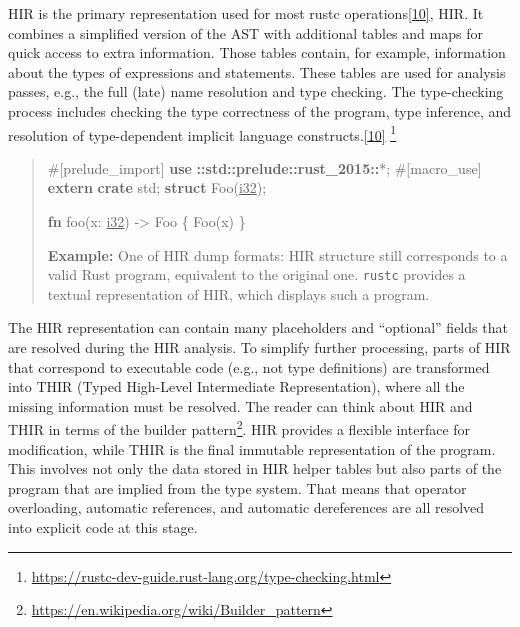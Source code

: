 \documentclass[
  11pt,
  twoside,symmetric]{report}
\newenvironment{Shaded}{}{}
\newcommand{\AttributeTok}[1]{#1}
\newcommand{\DataTypeTok}[1]{\underline{#1}}
\newcommand{\KeywordTok}[1]{\textbf{#1}}
\newcommand{\NormalTok}[1]{#1}
\newcommand{\OperatorTok}[1]{#1}
\newcommand{\PreprocessorTok}[1]{\textbf{#1}}
\DeclareRobustCommand{\href}[2]{#2\footnote{\url{#1}}}
\begin{document}
HIR is the primary representation used for most rustc
operations\protect\hyperlink{ref-devguide}{{[}10{]}}, HIR. It combines a
simplified version of the AST with additional tables and maps for quick
access to extra information. Those tables contain, for example,
information about the types of expressions and statements. These tables
are used for analysis passes, e.g., the full (late) name resolution and
type checking. The type-checking process includes checking the type
correctness of the program, type inference, and resolution of
type-dependent implicit language
constructs.\protect\hyperlink{ref-devguide}{{[}10{]}} \footnote{\url{https://rustc-dev-guide.rust-lang.org/type-checking.html}}

\begin{quote}
\begin{Shaded}
\begin{Highlighting}[]
 \AttributeTok{\#[}\NormalTok{prelude\_import}\AttributeTok{]}
 \KeywordTok{use} \PreprocessorTok{::std::prelude::rust\_2015::}\OperatorTok{*;}
 \AttributeTok{\#[}\NormalTok{macro\_use}\AttributeTok{]}
 \KeywordTok{extern} \KeywordTok{crate}\NormalTok{ std}\OperatorTok{;}
 \KeywordTok{struct}\NormalTok{ Foo(}\DataTypeTok{i32}\NormalTok{)}\OperatorTok{;}

 \KeywordTok{fn}\NormalTok{ foo(x}\OperatorTok{:} \DataTypeTok{i32}\NormalTok{) }\OperatorTok{{-}\textgreater{}}\NormalTok{ Foo }\OperatorTok{\{}\NormalTok{ Foo(x) }\OperatorTok{\}}
\end{Highlighting}
\end{Shaded}

\textbf{Example:} One of HIR dump formats: HIR structure still
corresponds to a valid Rust program, equivalent to the original one.
\texttt{rustc} provides a textual representation of HIR, which displays
such a program.
\end{quote}

The HIR representation can contain many placeholders and ``optional''
fields that are resolved during the HIR analysis. To simplify further
processing, parts of HIR that correspond to executable code (e.g., not
type definitions) are transformed into THIR (Typed High-Level
Intermediate Representation), where all the missing information must be
resolved. The reader can think about HIR and THIR in terms of the
\href{https://en.wikipedia.org/wiki/Builder_pattern}{builder pattern}.
HIR provides a flexible interface for modification, while THIR is the
final immutable representation of the program. This involves not only
the data stored in HIR helper tables but also parts of the program that
are implied from the type system. That means that operator overloading,
automatic references, and automatic dereferences are all resolved into
explicit code at this stage.
\end{document}
